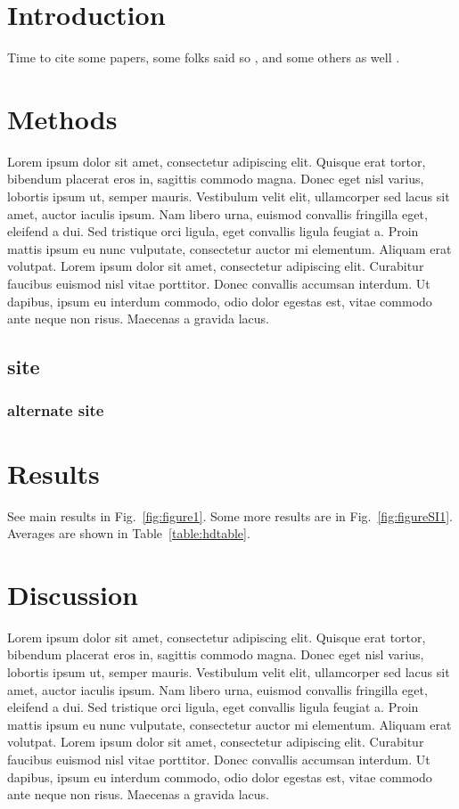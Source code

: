 \documentclass[a4paper]{article}\usepackage[]{graphicx}\usepackage[]{color}
\begin{document}
\section*{Introduction}

Time to cite some papers, some folks said so \cite{schenk_rooting_2002}, and some others as well \cite{mokany_critical_2006}.

\section*{Methods}

Lorem ipsum dolor sit amet, consectetur adipiscing elit. Quisque erat tortor, bibendum placerat eros in, sagittis commodo magna. Donec eget nisl varius, lobortis ipsum ut, semper mauris. Vestibulum velit elit, ullamcorper sed lacus sit amet, auctor iaculis ipsum. Nam libero urna, euismod convallis fringilla eget, eleifend a dui. Sed tristique orci ligula, eget convallis ligula feugiat a. Proin mattis ipsum eu nunc vulputate, consectetur auctor mi elementum. Aliquam erat volutpat. Lorem ipsum dolor sit amet, consectetur adipiscing elit. Curabitur faucibus euismod nisl vitae porttitor. Donec convallis accumsan interdum. Ut dapibus, ipsum eu interdum commodo, odio dolor egestas est, vitae commodo ante neque non risus. Maecenas a gravida lacus.

\subsection*{site}
\subsubsection*{alternate site}
\label{sec:site}

\section*{Results}

See main results in Fig.~\ref{fig:figure1}. Some more results are in Fig.~\ref{fig:figureSI1}. Averages are shown in Table~\ref{table:hdtable}.

\section*{Discussion}

Lorem ipsum dolor sit amet, consectetur adipiscing elit. Quisque erat tortor, bibendum placerat eros in, sagittis commodo magna. Donec eget nisl varius, lobortis ipsum ut, semper mauris. Vestibulum velit elit, ullamcorper sed lacus sit amet, auctor iaculis ipsum. Nam libero urna, euismod convallis fringilla eget, eleifend a dui. Sed tristique orci ligula, eget convallis ligula feugiat a. Proin mattis ipsum eu nunc vulputate, consectetur auctor mi elementum. Aliquam erat volutpat. Lorem ipsum dolor sit amet, consectetur adipiscing elit. Curabitur faucibus euismod nisl vitae porttitor. Donec convallis accumsan interdum. Ut dapibus, ipsum eu interdum commodo, odio dolor egestas est, vitae commodo ante neque non risus. Maecenas a gravida lacus.
\end{document}

